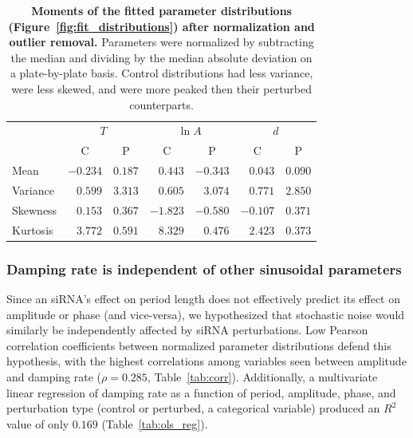 \documentclass[11pt, letterpaper]{article}
\begin{document}
\begin{table}
  \begin{center}
    \begin{tabular}{lrrrrrr}\toprule
      {} & \multicolumn{2}{c}{$T$} & \multicolumn{2}{c}{$\ln A$} & \multicolumn{2}{c}{$d$} \\
      {}         & \multicolumn{1}{c}{C}         & \multicolumn{1}{c}{P}           & \multicolumn{1}{c}{C}         & \multicolumn{1}{c}{P}               & \multicolumn{1}{c}{C}         & \multicolumn{1}{c}{P}           \\\midrule
      Mean     & $-0.234$ & $0.187$ & $0.443$  & $-0.343$ & $0.043$  & $0.090$    \\
      Variance & $ 0.599$ & $3.313$ & $0.605$  & $ 3.074$ & $0.771$  & $2.850$    \\
      Skewness & $ 0.153$ & $0.367$ & $-1.823$ & $-0.580$ & $-0.107$ & $0.371$    \\
      Kurtosis & $ 3.772$ & $0.591$ & $8.329$  & $ 0.476$ & $2.423$  & $0.373$    \\
      \bottomrule
    \end{tabular}
  \end{center}
  \caption{{\bfseries Moments of the fitted parameter distributions (Figure~\ref{fig:fit_distributions}) after normalization and outlier removal.} Parameters were normalized by subtracting the median and dividing by the median absolute deviation on a plate-by-plate basis. Control distributions had less variance, were less skewed, and were more peaked then their perturbed counterparts.}
  \label{tab:fit_distributions}
\end{table}

\subsubsection*{Damping rate is independent of other sinusoidal parameters}

Since an siRNA's effect on period length does not effectively predict its effect on amplitude or phase (and vice-versa), we hypothesized that stochastic noise would similarly be independently affected by siRNA perturbations.
Low Pearson correlation coefficients between normalized parameter distributions defend this hypothesis, with the highest correlations among variables seen between amplitude and damping rate ($\rho = 0.285$, Table~\ref{tab:corr}).
Additionally, a multivariate linear regression of damping rate as a function of period, amplitude, phase, and perturbation type (control or perturbed, a categorical variable) produced an $R^2$ value of only $0.169$ (Table~\ref{tab:ols_reg}).
\end{document}

